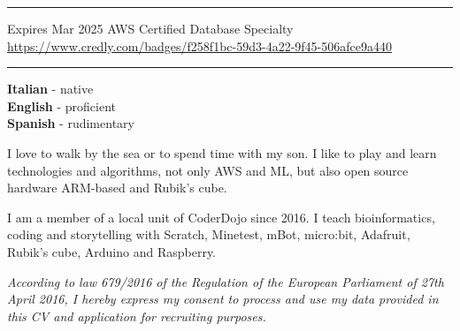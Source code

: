 \documentclass[8pt]{stackoverflow-upgraded-version} %
\begin{document}
\textcolor{stackoverflow}{\hrule}
\vspace{\baselineskip} %
\begin{entrylist}
	\entry
		{Expires Mar 2025}
		{AWS Certified Database}
		{Specialty}
		{\href{https://www.credly.com/badges/f258f1bc-59d3-4a22-9f45-506afce9a440}{https://www.credly.com/badges/f258f1bc-59d3-4a22-9f45-506afce9a440}}
\end{entrylist}


\textcolor{stackoverflow}{\hrule}
\vspace{\baselineskip} %
\begin{minipage}[t]{0.2\textwidth}

	\textbf{Italian} - native\\
	\textbf{English} - proficient\\
	\textbf{Spanish} - rudimentary
\end{minipage}
\hfill
\begin{minipage}[t]{0.35\textwidth}

	I love to walk by the sea or to spend time with my son.
	I like to play and learn technologies and algorithms, not only AWS and ML,
	but also open source hardware ARM-based and Rubik's cube.
\end{minipage}
\hfill
\begin{minipage}[t]{0.35\textwidth}

	I am a member of a local unit of CoderDojo since 2016.
	I teach bioinformatics, coding and storytelling with
	Scratch, Minetest, mBot, micro:bit, Adafruit, Rubik's cube, Arduino and Raspberry.\\
\end{minipage}

\vfill
\emph{\footnotesize According to law 679/2016 of the Regulation of the European Parliament of 27th April 2016, I hereby express my consent to process
and use my data provided in this CV and application for recruiting purposes.}

\newpage
\end{document}
